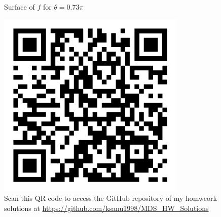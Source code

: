 \documentclass{article}
\begin{document}
\begin{flushleft}
\begin{figure}[htp]
         \caption{Surface of $f$ for $\theta=0.73\pi$}
 \end{figure}
 \clearpage
 \begin{figure}[htp]
         \centering
         \includegraphics[width=9cm]{qr-code.png}\\
         Scan this QR code to access the GitHub repository of my homweork solutions at \href{https://github.com/ksanu1998/MDS_HW_Solutions}{https://github.com/ksanu1998/MDS\_HW\_Solutions}
 \end{figure}
 \end{flushleft}
 
\end{document}
